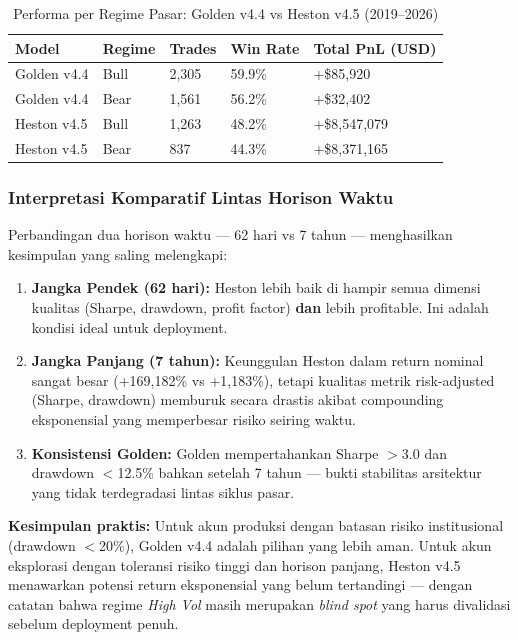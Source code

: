 \begin{table}[h!]
\centering
\caption{Performa per Regime Pasar: Golden v4.4 vs Heston v4.5 (2019--2026)}
\label{table:regime_7y}
\begin{tabular}{@{}lllll@{}}
\toprule
\textbf{Model} & \textbf{Regime} & \textbf{Trades} & \textbf{Win Rate} & \textbf{Total PnL (USD)} \\ \midrule
Golden v4.4    & Bull            & 2,305           & 59.9\%            & +\$85,920 \\
Golden v4.4    & Bear            & 1,561           & 56.2\%            & +\$32,402 \\
Heston v4.5    & Bull            & 1,263           & 48.2\%            & +\$8,547,079 \\
Heston v4.5    & Bear            & 837             & 44.3\%            & +\$8,371,165 \\
\bottomrule
\end{tabular}
\end{table}

\subsubsection{Interpretasi Komparatif Lintas Horison Waktu}

Perbandingan dua horison waktu --- 62 hari vs 7 tahun --- menghasilkan kesimpulan yang saling melengkapi:

\begin{enumerate}
    \item \textbf{Jangka Pendek (62 hari):} Heston lebih baik di hampir semua dimensi kualitas (Sharpe, drawdown, profit factor) \textbf{dan} lebih profitable. Ini adalah kondisi ideal untuk deployment.
    \item \textbf{Jangka Panjang (7 tahun):} Keunggulan Heston dalam return nominal sangat besar (+169,182\% vs +1,183\%), tetapi kualitas metrik risk-adjusted (Sharpe, drawdown) memburuk secara drastis akibat compounding eksponensial yang memperbesar risiko seiring waktu.
    \item \textbf{Konsistensi Golden:} Golden mempertahankan Sharpe $>$3.0 dan drawdown $<$12.5\% bahkan setelah 7 tahun --- bukti stabilitas arsitektur yang tidak terdegradasi lintas siklus pasar.
\end{enumerate}

\textbf{Kesimpulan praktis:} Untuk akun produksi dengan batasan risiko institusional (drawdown $<$20\%), Golden v4.4 adalah pilihan yang lebih aman. Untuk akun eksplorasi dengan toleransi risiko tinggi dan horison panjang, Heston v4.5 menawarkan potensi return eksponensial yang belum tertandingi --- dengan catatan bahwa regime \textit{High Vol} masih merupakan \textit{blind spot} yang harus divalidasi sebelum deployment penuh.

